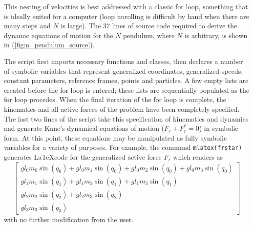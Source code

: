 \documentclass[twocolumn,10pt]{asme2e}
\begin{document}
This nesting of velocities is best addressed with a classic for loop, something
that is ideally suited for a computer (loop unrolling is difficult by hand when
there are many steps and $N$ is large). The 37 lines of source code required to
derive the dynamic equations of motion for the $N$ pendulum, where $N$ is
arbitrary, is shown in (\ref{fig:n_pendulum_source}).

The script first imports necessary functions and classes, then declares a
number of symbolic variables that represent generalized coordinates,
generalized speeds, constant parameters, reference frames, points and
particles. A few empty lists are created before the for loop is entered; these
lists are sequentially populated as the for loop procedes.  When the final
iteration of the for loop is complete, the kinematics and all active forces of
the problem have been completely specified. The last two lines of the script
take this specification of kinematics and dynamics and generate Kane's
dynamical equations of motion ($F_r + F_r^* = 0$) in symbolic form. At this
point, these equations may be manipulated as fully symbolic variables for a
variety of purposes. For example, the command \verb|mlatex(frstar)| generates
\LaTeX code for the generalized active force $F_r$ which renders as
\begin{equation}
\left[\begin{smallmatrix}g l_{0} m_{0} \operatorname{sin}\left(q_{0}\right) + g l_{0} m_{1} \operatorname{sin}\left(q_{0}\right) + g l_{0} m_{2} \operatorname{sin}\left(q_{0}\right) + g l_{0} m_{3} \operatorname{sin}\left(q_{0}\right)\\g l_{1} m_{1} \operatorname{sin}\left(q_{1}\right) + g l_{1} m_{2} \operatorname{sin}\left(q_{1}\right) + g l_{1} m_{3} \operatorname{sin}\left(q_{1}\right)\\g l_{2} m_{2} \operatorname{sin}\left(q_{2}\right) + g l_{2} m_{3} \operatorname{sin}\left(q_{2}\right)\\g l_{3} m_{3} \operatorname{sin}\left(q_{3}\right)\end{smallmatrix}\right]
\end{equation}
with no further modification from the user.
\end{document}
